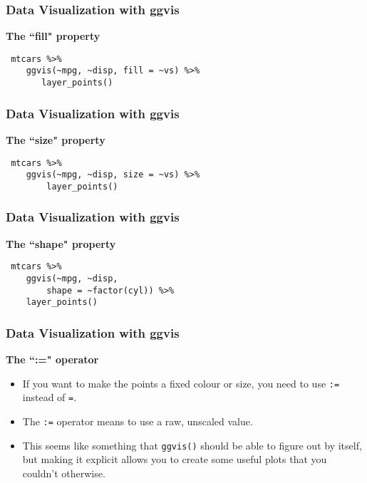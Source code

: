\documentclass[MASTER.tex]{subfiles}
\begin{document}
\begin{frame}[fragile]
	\frametitle{Data Visualization with ggvis}
		\Large

\textbf{The ``fill" property}		
\begin{framed}
	\begin{verbatim}
 mtcars %>% 
    ggvis(~mpg, ~disp, fill = ~vs) %>% 
       layer_points()
\end{verbatim}
\end{framed}

\end{frame}

\begin{frame}[fragile]
	\frametitle{Data Visualization with ggvis}
		\Large
	\vspace{-1.4cm}
	\textbf{The ``size" property}		
\begin{framed}
	\begin{verbatim}	
 mtcars %>% 
    ggvis(~mpg, ~disp, size = ~vs) %>% 
        layer_points()
\end{verbatim}
\end{framed}

\end{frame}

\begin{frame}[fragile]
	\frametitle{Data Visualization with ggvis}
	\Large
	
	\textbf{The ``shape" property}	
\begin{framed}
	\begin{verbatim}	
 mtcars %>% 
    ggvis(~mpg, ~disp, 
        shape = ~factor(cyl)) %>% 
    layer_points()
\end{verbatim}
\end{framed}

\end{frame}
	

\begin{frame}
\frametitle{Data Visualization with ggvis}
\Large
 \textbf{The ``:=" operator}
\begin{itemize}
\item If you want to make the points a fixed colour or size, you need to use \texttt{:=} instead of \texttt{=}. 
\item The \texttt{:=} operator means to use a raw, unscaled value. 
\item This seems like something that \texttt{ggvis()} should be able to figure out by itself, but making it explicit allows you to create some useful plots that you couldn’t otherwise. 
\end{itemize}


\end{frame}
\end{document}

